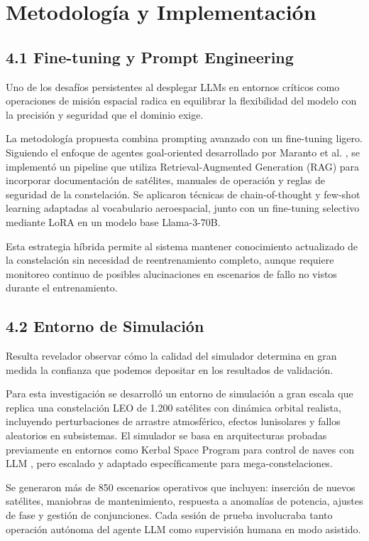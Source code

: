 \section{Metodología y Implementación}

\subsection{4.1 Fine-tuning y Prompt Engineering}

Uno de los desafíos persistentes al desplegar LLMs en entornos críticos como operaciones de misión espacial radica en equilibrar la flexibilidad del modelo con la precisión y seguridad que el dominio exige.

La metodología propuesta combina prompting avanzado con un fine-tuning ligero. Siguiendo el enfoque de agentes goal-oriented desarrollado por Maranto et al. \cite{maranto2024llmsat}, se implementó un pipeline que utiliza Retrieval-Augmented Generation (RAG) para incorporar documentación de satélites, manuales de operación y reglas de seguridad de la constelación. Se aplicaron técnicas de chain-of-thought y few-shot learning adaptadas al vocabulario aeroespacial, junto con un fine-tuning selectivo mediante LoRA en un modelo base Llama-3-70B.

Esta estrategia híbrida permite al sistema mantener conocimiento actualizado de la constelación sin necesidad de reentrenamiento completo, aunque requiere monitoreo continuo de posibles alucinaciones en escenarios de fallo no vistos durante el entrenamiento.

\subsection{4.2 Entorno de Simulación}

Resulta revelador observar cómo la calidad del simulador determina en gran medida la confianza que podemos depositar en los resultados de validación.

Para esta investigación se desarrolló un entorno de simulación a gran escala que replica una constelación LEO de 1.200 satélites con dinámica orbital realista, incluyendo perturbaciones de arrastre atmosférico, efectos lunisolares y fallos aleatorios en subsistemas. El simulador se basa en arquitecturas probadas previamente en entornos como Kerbal Space Program para control de naves con LLM \cite{rodriguez2024llm}, pero escalado y adaptado específicamente para mega-constelaciones.

Se generaron más de 850 escenarios operativos que incluyen: inserción de nuevos satélites, maniobras de mantenimiento, respuesta a anomalías de potencia, ajustes de fase y gestión de conjunciones. Cada sesión de prueba involucraba tanto operación autónoma del agente LLM como supervisión humana en modo asistido.

